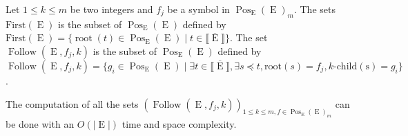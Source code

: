 \documentclass{llncs}
\def\Po#1#2{\Pos_{#1}{(#2)}}
\DeclareMathOperator{\E}{E}
\DeclareMathOperator{\Follow}{Follow}
\DeclareMathOperator{\rooot}{root}
\DeclareMathOperator{\Pos}{Pos}
\def\b#1{\overline{#1}}
\begin{document}
Let
  $1\leq k\leq m$ be two integers and $f_j$ be a symbol in $\Po{\E}{\E}_m$. The sets $\mathrm{First}(\E)$ is the subset of $\Po{\E}{\E}$ defined by $\mathrm{First}(\E)=\{\rooot(t)\in \Po{\E}{\E} \mid t\in \llbracket \b{\E} \rrbracket\}$. The set $\Follow(\E,f_j,k)$ is the subset of $\Po{\E}{\E}$ defined by $\Follow(\E,f_j,k)=\{g_i\in \Po{\E}{\E} \mid \exists t\in \llbracket \overline{\E} \rrbracket, \exists s\preccurlyeq t, \mathrm{root}(s)=f_j, k\mbox{-}\mathrm{child(s)}=g_i\}$.
  
\begin{proposition}\label{prop tps lin pour follow}
The computation of all the sets $(\Follow(\E,f_j,k))_{1\leq k\leq m, f\in\Po{\E}{\E}_m}$ can be done with an $O(|\E|)$ time and space complexity. 
\end{proposition}
\end{document}
